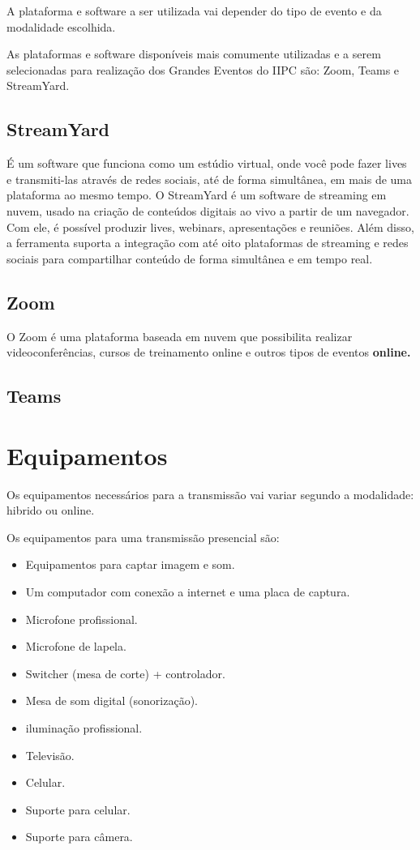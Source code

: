 \documentclass[
]{book}
\providecommand{\tightlist}{%
  \setlength{\itemsep}{0pt}\setlength{\parskip}{0pt}}
\begin{document}
A plataforma e software a ser utilizada vai depender do tipo de evento e
da modalidade escolhida.

As plataformas e software disponíveis mais comumente utilizadas e a
serem selecionadas para realização dos Grandes Eventos do IIPC são:
Zoom, Teams e StreamYard.

\subsection{StreamYard}\label{streamyard}

É um software que funciona como um estúdio virtual, onde você pode fazer
lives e transmiti-las através de redes sociais, até de forma simultânea,
em mais de uma plataforma ao mesmo tempo. O StreamYard é um software de
streaming em nuvem, usado na criação de conteúdos digitais ao vivo a
partir de um navegador. Com ele, é possível produzir lives, webinars,
apresentações e reuniões. Além disso, a ferramenta suporta a integração
com até oito plataformas de streaming e redes sociais para compartilhar
conteúdo de forma simultânea e em tempo real.

\subsection{Zoom}\label{zoom}

O Zoom é uma plataforma baseada em nuvem que possibilita realizar
videoconferências, cursos de treinamento online e outros tipos de
eventos \textbf{online.}

\subsection{Teams}\label{teams}

\section{Equipamentos}\label{equipamentos}

Os equipamentos necessários para a transmissão vai variar segundo a
modalidade: hibrido ou online.

Os equipamentos para uma transmissão presencial são:

\begin{itemize}
\tightlist
\item
  Equipamentos para captar imagem e som.
\item
  Um computador com conexão a internet e uma placa de captura.
\item
  Microfone profissional.
\item
  Microfone de lapela.
\item
  Switcher (mesa de corte) + controlador.
\item
  Mesa de som digital (sonorização).
\item
  iluminação profissional.
\item
  Televisão.
\item
  Celular.
\item
  Suporte para celular.
\item
  Suporte para câmera.
\end{itemize}
\end{document}
